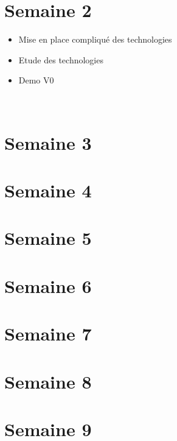 \documentclass[11pt,fleqn]{book}
\begin{document}
								\chapter{Semaine 2}
\begin{itemize}
\item Mise  en  place  compliqué  des  technologies
\item Etude  des  technologies
\item Demo  V0
\end{itemize}
~\\
								\chapter{Semaine 3}
								\chapter{Semaine 4}
								\chapter{Semaine 5}
								\chapter{Semaine 6}
								\chapter{Semaine 7}
								\chapter{Semaine 8}
								\chapter{Semaine 9}
\end{document}
